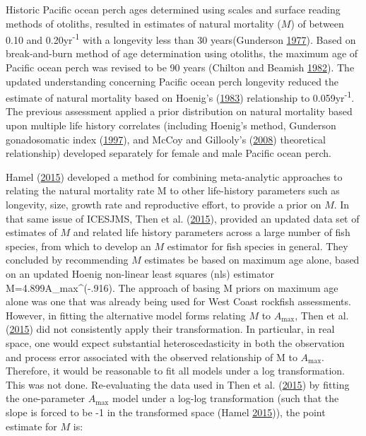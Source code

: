 \documentclass[12pt,]{article}
\begin{document}
Historic Pacific ocean perch ages determined using scales and surface
reading methods of otoliths, resulted in estimates of natural mortality
(\(M\)) of between 0.10 and 0.20yr\textsuperscript{-1} with a longevity
less than 30 years(Gunderson
\protect\hyperlink{ref-gunderson_population_1977}{1977}). Based on
break-and-burn method of age determination using otoliths, the maximum
age of Pacific ocean perch was revised to be 90 years (Chilton and
Beamish \protect\hyperlink{ref-chilton_age_1982}{1982}). The updated
understanding concerning Pacific ocean perch longevity reduced the
estimate of natural mortality based on Hoenig's
(\protect\hyperlink{ref-hoenig_empirical_1983}{1983}) relationship to
0.059yr\textsuperscript{-1}. The previous assessment applied a prior
distribution on natural mortality based upon multiple life history
correlates (including Hoenig's method, Gunderson gonadosomatic index
(\protect\hyperlink{ref-gunderson_trade-off_1997}{1997}), and McCoy and
Gillooly's (\protect\hyperlink{ref-mccoy_predicting_2008}{2008})
theoretical relationship) developed separately for female and male
Pacific ocean perch.

Hamel (\protect\hyperlink{ref-hamel_method_2015}{2015}) developed a
method for combining meta-analytic approaches to relating the natural
mortality rate M to other life-history parameters such as longevity,
size, growth rate and reproductive effort, to provide a prior on \(M\).
In that same issue of ICESJMS, Then et al.
(\protect\hyperlink{ref-then_evaluating_2015}{2015}), provided an
updated data set of estimates of \(M\) and related life history
parameters across a large number of fish species, from which to develop
an \(M\) estimator for fish species in general. They concluded by
recommending \(M\) estimates be based on maximum age alone, based on an
updated Hoenig non-linear least squares (nls) estimator
M=4.899A\_max\^{}(-.916). The approach of basing M priors on maximum age
alone was one that was already being used for West Coast rockfish
assessments. However, in fitting the alternative model forms relating
\(M\) to \(A_{\text{max}}\), Then et al.
(\protect\hyperlink{ref-then_evaluating_2015}{2015}) did not
consistently apply their transformation. In particular, in real space,
one would expect substantial heteroscedasticity in both the observation
and process error associated with the observed relationship of M to
\(A_{\text{max}}\). Therefore, it would be reasonable to fit all models
under a log transformation. This was not done. Re-evaluating the data
used in Then et al. (\protect\hyperlink{ref-then_evaluating_2015}{2015})
by fitting the one-parameter \(A_{\text{max}}\) model under a log-log
transformation (such that the slope is forced to be -1 in the
transformed space (Hamel
\protect\hyperlink{ref-hamel_method_2015}{2015})), the point estimate
for \(M\) is:
\end{document}
